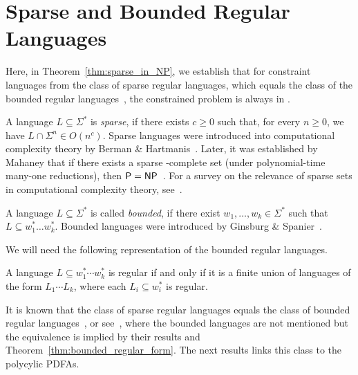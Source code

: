 \section{Sparse and Bounded Regular Languages}
\label{sec:sparse}

Here, in Theorem~\ref{thm:sparse_in_NP}, we establish that for constraint languages from the class of sparse regular languages, which equals the class of the bounded regular languages~\cite{DBLP:journals/eik/LatteuxT84}, the constrained problem
is always in \NP.


A language $L \subseteq \Sigma^*$ is \emph{sparse},
if there exists $c \ge 0$
such that, for every $n \ge 0$, we have
$L \cap \Sigma^n \in O(n^c)$.
Sparse languages were introduced into computational complexity
theory by Berman \& Hartmanis~\cite{DBLP:journals/siamcomp/BermanH77}.
Later, it was established by Mahaney that if there exists
a sparse \NP-complete set (under polynomial-time many-one reductions),
then $\textsf{P} = \textsf{NP}$~\cite{DBLP:journals/jcss/Mahaney82}.
For a survey on the relevance of sparse sets in computational complexity theory, see~\cite{DBLP:conf/mfcs/HartmanisM80}.


A language $L \subseteq \Sigma^*$ is called \emph{bounded},
if there exist $w_1, \ldots, w_k \in \Sigma^*$
such that $L \subseteq w_1^* \ldots w_k^*$. %
Bounded languages were introduced by Ginsburg \& Spanier~\cite{GinsburgSpanier64}.

We will need the following representation of the bounded regular languages.


\begin{theorem}
\label{thm:bounded_regular_form}
 A language $L \subseteq w_1^* \cdots w_k^*$ is regular if and only if
 it is a finite union of languages of the form $L_1 \cdots L_k$, where each $L_i \subseteq w_i^*$ is regular.
\end{theorem}

It is known that the class of sparse regular languages equals
the class of bounded regular languages~\cite{DBLP:journals/eik/LatteuxT84},
or see~\cite{Pin2020,DBLP:reference/hfl/Yu97}, where the bounded languages are not mentioned
but the equivalence is implied by their results and Theorem~\ref{thm:bounded_regular_form}.
The next results links this class to the polycylic PDFAs.

